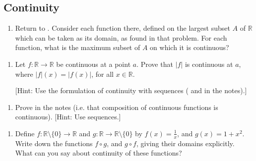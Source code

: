 \documentclass[letterpaper,10pt,english]{jupyterBook}
\begin{document}
\subsection{Continuity}
\label{\detokenize{Problems:continuity}}\label{\detokenize{Problems:ch3prob}}\label{\detokenize{Problems:id13}}\begin{enumerate}
%
\setcounter{enumi}{12}
\item {} 
\sphinxAtStartPar
Return to {\hyperref[\detokenize{Problems:id1}]{}}. Consider each function there, defined on the largest subset \(A\) of \(\mathbb{R}\)
which can be taken as its domain, as found in that problem. For each function, what is the maximum subset of \(A\) on which it is continuous?

\end{enumerate}
\label{\detokenize{Problems:id14}}\begin{enumerate}
%
\setcounter{enumi}{13}
\item {} 
\sphinxAtStartPar
Let \(f: \mathbb{R} \rightarrow \mathbb{R}\) be continuous at a point \(a\).
Prove that \(|f|\) is continuous at \(a\), where \(|f|(x) = |f(x)|\), for all \(x \in \mathbb{R}\).

{[}Hint: Use the formulation of continuity with sequences ( and  in the notes).{]}

\end{enumerate}
\label{\detokenize{Problems:id15}}\begin{enumerate}
%
\setcounter{enumi}{14}
\item {} 
\sphinxAtStartPar
Prove  in the notes (i.e. that composition of continuous functions is continuous). {[}Hint: Use sequences.{]}

\end{enumerate}
\label{\detokenize{Problems:id16}}\begin{enumerate}
%
\setcounter{enumi}{15}
\item {} 
\sphinxAtStartPar
Define \(f:\mathbb{R} \setminus \{0\}\to \mathbb{R}\) and \(g: \mathbb{R} \rightarrow \mathbb{R}\setminus \{0\}\) by \(f(x) = \frac{1}{x}\), and \(g(x) = 1 + x^{2}\). Write down the functions \(f \circ g\), and \(g \circ f\), giving their domains explicitly. What can you say about continuity of these functions?

\end{enumerate}
\end{document}
